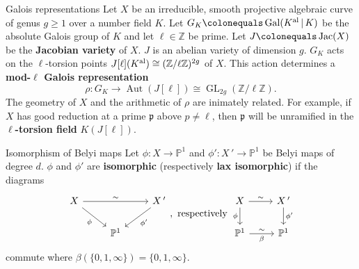 \documentclass[xcolor=dvipsnames]{beamer}
\theoremstyle{plain}
\newcommand{\PP}{\mathbb P}
\newcommand{\ZZ}{\mathbb Z}
\newcommand{\Kal}{{{K}^{\textup{al}}}}
\DeclareMathOperator{\Aut}{Aut}
\DeclareMathOperator{\Gal}{Gal}
\DeclareMathOperator{\GL}{GL}
\DeclareMathOperator{\Jac}{Jac}
\begin{document}
  \begin{frame}{Galois representations}
    Let $X$ be an irreducible, smooth
    projective algebraic curve of genus $g\geq 1$
    over a number field $K$.
    Let $G_K\colonequals\Gal(\Kal\,|\,K)$ be
    the absolute Galois group of $K$ and
    let $\ell\in\ZZ$ be prime.
    \newline
    Let $J\colonequals\Jac(X)$ be the
    \textbf{Jacobian variety} of $X$.
    $J$ is an abelian variety of dimension $g$.
    \newline
    $G_K$ acts on the $\ell$-torsion points
    $J[\ell](\Kal)\cong(\ZZ/\ell\ZZ)^{2g}$ of $X$.
    \newline
    This action determines a
    \textbf{mod-$\ell$ Galois representation}
    \[
      \rho\colon G_K\to\Aut(J[\ell])\cong\GL_{2g}(\ZZ/\ell\ZZ).
    \]
    The geometry of $X$ and the arithmetic of
    $\rho$ are inimately related.
    For example,
    if $X$ has good reduction at a prime
    $\mathfrak{p}$ above
    $p\neq\ell$,
    then $\mathfrak{p}$
    will be unramified in the
    \textbf{$\ell$-torsion field}
    $K(J[\ell])$.
  \end{frame}
  \begin{frame}[fragile]{Isomorphism of Belyi maps}
    Let $\phi\colon X\to\PP^1$
    and
    $\phi'\colon X\,'\to\PP^1$
    be Belyi maps of degree $d$.
    \newline
    $\phi$ and $\phi'$ are
    \textbf{isomorphic}
    (respectively \textbf{lax isomorphic})
    if the diagrams
    \[
      \begin{tikzcd}
        X\arrow{rr}{\sim}\arrow{dr}[swap]{\phi}
        &
        &X\,'\arrow{dl}{\phi'}\\
        &\PP^1
      \end{tikzcd},
      \text{ respectively }
      \begin{tikzcd}
        X\arrow{r}{\sim}\arrow{d}[swap]{\phi}&X\,'\arrow{d}{\phi'}\\
        \PP^1\arrow{r}{\sim}[swap]{\beta}&\PP^1
      \end{tikzcd}
    \]
    commute
    where $\beta(\{0,1,\infty\}) = \{0,1,\infty\}$.
  \end{frame}
\end{document}
